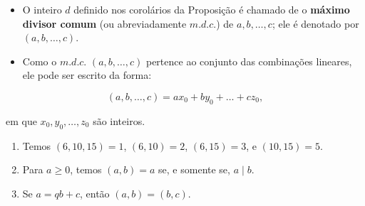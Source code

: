         \begin{definicao}
            \begin{itemize}[left=0.5cm, align=left, nosep]
                \item O inteiro $d$ definido nos corolários da Proposição é chamado 
                de o \textbf{máximo divisor comum} (ou abreviadamente \textbf{$m.d.c.$}) de $a, b, \ldots, c$; ele é denotado por $(a, b, \ldots, c)$.  
                \item  Como o $m.d.c.$ $(a, b, \ldots, c)$ pertence ao conjunto das combinações lineares, 
                ele pode ser escrito da forma: 
            \end{itemize}
               
            \vspace{-0.5cm}
            \[
                (a, b, \ldots, c) = ax_0 + by_0 + \ldots + cz_0,
            \]
            
            \hspace{1cm} em que $x_0, y_0, \ldots, z_0$ são inteiros.
        
        \end{definicao}

    \begin{exemplo}
        \begin{enumerate}[left=0.5cm, align=left, nosep]
            \item Temos $(6, 10, 15) = 1$, $(6, 10) = 2$, $(6, 15) = 3$, e $(10, 15) = 5$.
            \item Para $a \ge 0$, temos $(a, b) = a$ se, e somente se, $a \mid b$.
            \item Se $a = qb + c$, então $(a, b) = (b, c)$.
        \end{enumerate}
    \end{exemplo}
